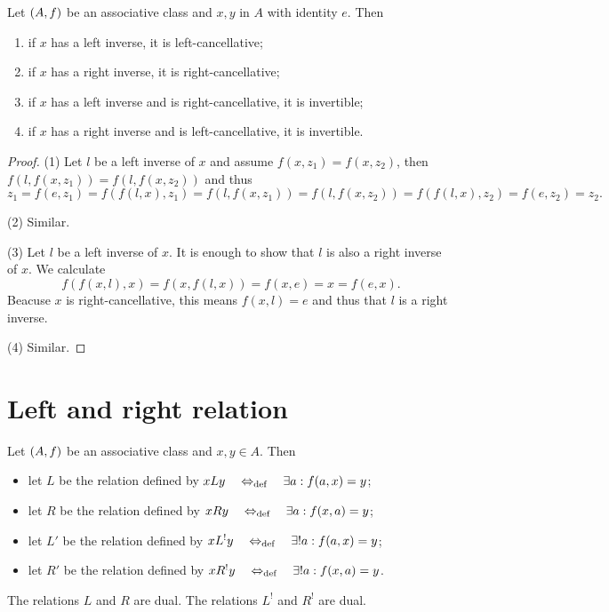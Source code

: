 \begin{lemma}
Let $\left( A, f \right)$ be an associative class and $x,y$ in $A$ with identity $e$. Then
\begin{enumerate}
\item if $x$ has a left inverse, it is left-cancellative;
\item if $x$ has a right inverse, it is right-cancellative;
\item if $x$ has a left inverse and is right-cancellative, it is invertible;
\item if $x$ has a right inverse and is left-cancellative, it is invertible.
\end{enumerate}
\end{lemma}
\begin{proof}
(1) Let $l$ be a left inverse of $x$ and assume $f(x, z_1) = f(x,z_2)$, then $f(l, f(x,z_1)) = f(l, f(x,z_2))$ and thus
\[ z_1 = f(e,z_1) = f(f(l,x), z_1) = f(l, f(x,z_1)) = f(l, f(x,z_2)) = f(f(l,x), z_2) = f(e,z_2) = z_2. \]

(2) Similar.

(3) Let $l$ be a left inverse of $x$. It is enough to show that $l$ is also a right inverse of $x$. We calculate
\[ f(f(x,l), x) = f(x, f(l,x)) = f(x, e) = x = f(e,x). \]
Beacuse $x$ is right-cancellative, this means $f(x,l) = e$ and thus that $l$ is a right inverse.

(4) Similar.
\end{proof}


\section{Left and right relation}
\begin{definition}
Let $\left( A, f \right)$ be an associative class and $x, y\in A$. Then
\begin{itemize}
\item let $L$ be the relation defined by $xLy \quad\Leftrightarrow_{\text{def}}\quad \exists a: f(a, x) = y$;
\item let $R$ be the relation defined by $xRy \quad\Leftrightarrow_{\text{def}}\quad \exists a: f(x, a) = y$;
\item let $L'$ be the relation defined by $xL^!y \quad\Leftrightarrow_{\text{def}}\quad  \exists! a: f(a, x) = y$;
\item let $R'$ be the relation defined by $xR^!y \quad\Leftrightarrow_{\text{def}}\quad \exists! a: f(x, a) = y$.
\end{itemize}
\end{definition}

The relations $L$ and $R$ are dual. The relations $L^!$ and $R^!$ are dual.

